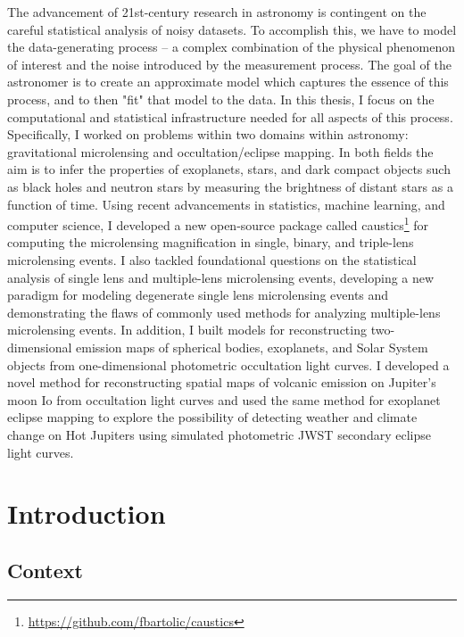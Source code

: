 \documentclass[12pt,dvipsnames]{report}
\newcommand{\ssf}[1]{\textsf{#1}}
\begin{document}
The advancement of 21st-century research in astronomy is contingent on the careful statistical analysis of 
noisy datasets. To accomplish this, we have to model the data-generating process -- a complex
combination of the physical phenomenon of interest and the noise introduced by the measurement process.
The goal of the astronomer is to create an approximate model which captures the essence of this process,
and to then "fit" that model to the data.
In this thesis, I focus on the computational and statistical infrastructure needed for all 
aspects of this process. 
Specifically, I worked on problems within two domains within astronomy: gravitational microlensing and 
occultation/eclipse mapping. In both fields the aim is to infer the properties of exoplanets, stars, and dark compact 
objects such as black holes and neutron stars by measuring the brightness of distant stars as a function of time.
Using recent advancements in statistics, machine learning, and computer science, I developed a new open-source 
package called \ssf{caustics}\footnote{\url{https://github.com/fbartolic/caustics}} for computing the microlensing magnification 
in single, binary, and triple-lens microlensing events.
 I also tackled foundational questions on the statistical analysis of single lens and multiple-lens microlensing 
 events, developing a new paradigm for modeling degenerate single lens microlensing events and demonstrating the flaws 
 of commonly used methods for analyzing multiple-lens microlensing events.
In addition, I built models for reconstructing two-dimensional emission maps of spherical bodies, exoplanets, 
and Solar System objects from one-dimensional photometric occultation light curves. 
I developed a novel method for reconstructing spatial maps of volcanic emission on Jupiter's moon Io from 
occultation light curves and used the same method for exoplanet eclipse mapping to explore the possibility of 
detecting weather and climate change on Hot Jupiters using simulated photometric JWST secondary eclipse light curves. 

\newpage
\thispagestyle{empty}


\chapter{Introduction}
\section{Context}

\end{document}
